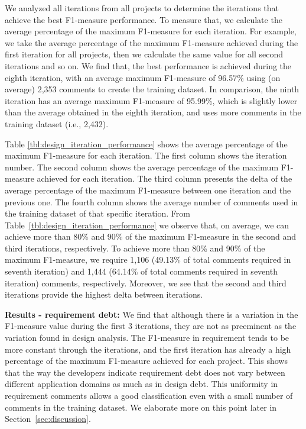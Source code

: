 We analyzed all iterations from all projects to determine the iterations that achieve the best F1-measure performance. To measure that, we calculate the average percentage of the maximum F1-measure for each iteration. For example, we take the average percentage of the maximum F1-measure achieved during the first iteration for all projects, then we calculate the same value for all second iterations and so on. We find that, the best performance is achieved during the eighth iteration, with an average maximum F1-measure of 96.57\% using (on average) 2,353 comments to create the training dataset. In comparison, the ninth iteration has an average  maximum F1-measure of 95.99\%, which is slightly lower than the average obtained in the eighth iteration, and uses more comments in the training dataset (i.e., 2,432).

Table \ref{tbl:design_iteration_performance} shows the average percentage of the maximum F1-measure for each iteration. The first column shows the iteration number. The second column shows the average percentage of the maximum F1-measure achieved for each iteration. The third column presents the delta of the average percentage of the maximum F1-measure between one iteration and the previous one. The fourth column shows the average number of comments used in the training dataset of that specific iteration. From Table~\ref{tbl:design_iteration_performance} we observe that, on average, we can achieve more than 80\% and 90\% of the maximum F1-measure in the second and third iterations, respectively. To achieve more than 80\% and 90\% of the maximum F1-measure, we require 1,106 (49.13\% of total comments required in seventh iteration) and 1,444 (64.14\% of total comments required in seventh iteration) comments, respectively. Moreover, we see that the second and third iterations provide the highest delta between iterations.

\noindent \textbf{Results - requirement debt:} We find that although there is a variation in the F1-measure value during the first 3 iterations, they are not as preeminent as the variation found in design \SATD analysis. The F1-measure in requirement \SATD tends to be more constant through the iterations, and the first iteration has already a high percentage of the maximum F1-measure achieved for each project. This shows that the way the developers indicate requirement debt does not vary between different application domains as much as in design debt. This uniformity in requirement \SATD comments allows a good classification even with a small number of comments in the training dataset. We elaborate more on this point later in Section~\ref{sec:discussion}.

